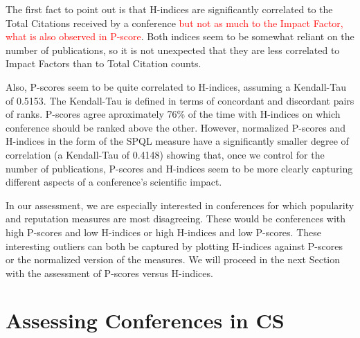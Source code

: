 \documentclass[notitlepage]{svjour3}
\begin{document}
The first fact to point out is that H-indices are significantly correlated to the Total Citations
received by a conference \textcolor{red}{but not as much to the Impact Factor,
what is also observed in P-score}. Both indices seem to be somewhat reliant on the number of 
publications, so it is not unexpected that they are less correlated to Impact Factors
than to Total Citation counts. 

Also, P-scores seem to be quite correlated to H-indices, assuming a Kendall-Tau of 0.5153.
The Kendall-Tau is defined in terms of concordant and discordant pairs of ranks.
P-scores agree aproximately 76\% of the time with H-indices on which conference should be
ranked above the other. However, normalized P-scores and H-indices in the form of the SPQL
measure have a significantly smaller degree of correlation (a Kendall-Tau of 0.4148) 
showing that, once we control for the number of publications, P-scores and H-indices seem
to be more clearly capturing different aspects of a conference's scientific impact. 

In our assessment, we are especially interested in conferences for which popularity 
and reputation measures are most disagreeing. These would be conferences with high P-scores 
and low H-indices or high H-indices and low P-scores. These interesting outliers can both
be captured by plotting H-indices against P-scores or the normalized version of the measures.
We will proceed in the next Section with the assessment of P-scores versus H-indices.


\section{Assessing Conferences in CS}
\label{sec:notifications}
\end{document}
